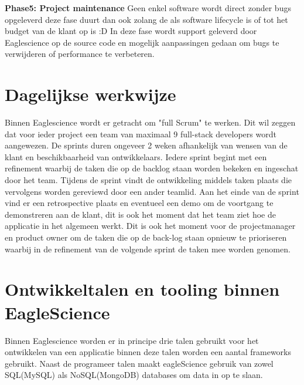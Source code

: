 \textbf{Phase5: Project maintenance}
Geen enkel software wordt direct zonder bugs opgeleverd deze fase duurt dan ook zolang de als software lifecycle is of tot het budget van de klant op is :D In deze fase wordt support geleverd door Eaglescience op de source code en mogelijk aanpassingen gedaan om bugs te verwijderen of performance te verbeteren.

\section{Dagelijkse werkwijze}\label{sec:dagelijkse-werkwijze}
Binnen Eaglescience wordt er getracht om "full Scrum" te werken.
Dit wil zeggen dat voor ieder project een team van maximaal 9 full-stack developers wordt aangewezen.
De sprints duren ongeveer 2 weken afhankelijk van wensen van de klant en beschikbaarheid van ontwikkelaars.
Iedere sprint begint met een refinement waarbij de taken die op de backlog staan worden bekeken en ingeschat door het team.
Tijdens de sprint vindt de ontwikkeling middels taken plaats die vervolgens worden gereviewd door een ander teamlid.
Aan het einde van de sprint vind er een retrospective plaats en eventueel een demo om de voortgang te demonstreren aan de klant, dit is ook het moment dat het team ziet hoe de applicatie in het algemeen werkt.
Dit is ook het moment voor de projectmanager en product owner om de taken die op de back-log staan opnieuw te prioriseren waarbij in de refinement van de volgende sprint de taken mee worden genomen.

\section{Ontwikkeltalen en tooling binnen EagleScience}\label{sec:ontwikkeltalen-en-tooling-binnen-eaglescience}
Binnen Eaglescience worden er in principe drie talen gebruikt voor het ontwikkelen van een applicatie binnen deze talen worden een aantal frameworks gebruikt.
Naast de programeer talen maakt eagleScience gebruik van zowel SQL(MySQL) als NoSQL(MongoDB) databases om data in op te slaan.

